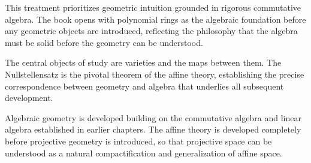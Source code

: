 \begin{remark}
This treatment prioritizes geometric intuition grounded in
rigorous commutative algebra. The book opens with polynomial rings
as the algebraic foundation before any geometric objects are introduced,
reflecting the philosophy that the algebra must be solid before
the geometry can be understood.
\end{remark}
\begin{remark}
The central objects of study are varieties and the maps between them.
The Nullstellensatz is the pivotal theorem of the affine theory,
establishing the precise correspondence between geometry and algebra
that underlies all subsequent development.
\end{remark}
\begin{remark}
Algebraic geometry is developed building on the commutative algebra
and linear algebra established in earlier chapters.
The affine theory is developed completely before projective geometry
is introduced, so that projective space can be understood as a
natural compactification and generalization of affine space.
\end{remark}
 
% 
% 
% 
% 
% 
% 
% 
% 
% 
% 
% 
% 
% 
% 
% 
